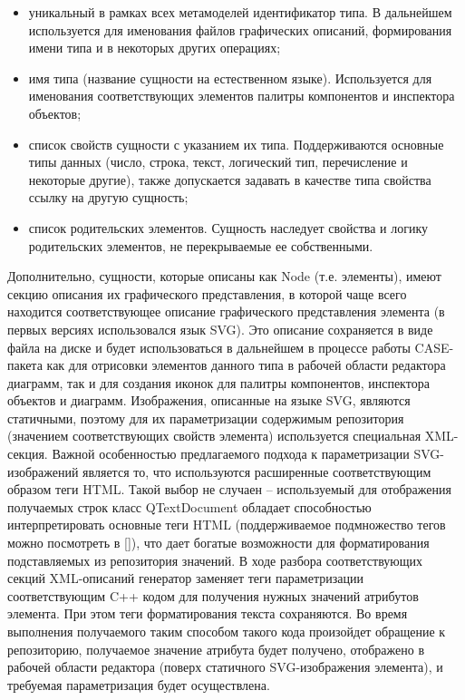 \documentclass[a4paper]{article}
\newcommand\liststyleWWviiiNumxiii{%
\renewcommand\theenumi{\arabic{enumi}}
\renewcommand\theenumii{\arabic{enumii}}
\renewcommand\theenumiii{\arabic{enumiii}}
\renewcommand\labelitemi{[F0B7?]}
\renewcommand\labelenumi{\theenumi.}
\renewcommand\labelenumii{\theenumii.}
\renewcommand\labelenumiii{\theenumiii.}
}
\begin{document}
\liststyleWWviiiNumxiii
\begin{itemize}
\item {
уникальный в рамках всех метамоделей идентификатор типа. В дальнейшем
используется для именования файлов графических описаний, формирования
имени типа и в некоторых других операциях; }
\item {
имя типа (название сущности на естественном языке). Используется для
именования соответствующих элементов палитры компонентов и инспектора
объектов;}
\item {
список свойств сущности с указанием их типа. Поддерживаются основные
типы данных (число, строка, текст, логический тип, перечисление и
некоторые другие), также допускается задавать в качестве типа свойства
ссылку на другую сущность;}
\item {
список родительских элементов. Сущность наследует свойства и логику
родительских элементов, не перекрываемые ее собственными.}
\end{itemize}
{
Дополнительно, сущности, которые описаны как
\foreignlanguage{english}{Node} (т.е. элементы), имеют секцию описания
их графического представления, в которой чаще всего находится
соответствующее описание графического представления элемента (в первых
версиях использовался язык \foreignlanguage{english}{SVG}). Это
описание сохраняется в виде файла на диске и будет использоваться в
дальнейшем в процессе работы \foreignlanguage{english}{CASE}{}-пакета
как для отрисовки элементов данного типа в рабочей области редактора
диаграмм, так и для создания иконок для палитры компонентов, инспектора
объектов и диаграмм. Изображения, описанные на языке
\foreignlanguage{english}{SVG}, являются статичными, поэтому для их
параметризации содержимым репозитория (значением соответствующих
свойств элемента) используется специальная
\foreignlanguage{english}{XML}{}-секция. Важной особенностью
предлагаемого подхода к параметризации
\foreignlanguage{english}{SVG}{}-изображений является то, что
используются расширенные соответствующим образом теги
\foreignlanguage{english}{HTML}. Такой выбор не случаен – используемый
для отображения получаемых строк класс
\foreignlanguage{english}{QTextDocument} обладает способностью
интерпретировать основные теги \foreignlanguage{english}{HTML}
(поддерживаемое подмножество тегов можно посмотреть в []), что дает
богатые возможности для форматирования подставляемых из репозитория
значений. В ходе разбора соответствующих секций
\foreignlanguage{english}{XML}{}-описаний генератор заменяет теги
параметризации соответствующим \foreignlanguage{english}{C}++ кодом для
получения нужных значений атрибутов элемента. При этом теги
форматирования текста сохраняются. Во время выполнения получаемого
таким способом такого кода произойдет обращение к репозиторию,
получаемое значение атрибута будет получено, отображено в рабочей
области редактора (поверх статичного
\foreignlanguage{english}{SVG}{}-изображения элемента), и требуемая
параметризация будет осуществлена.}
\end{document}
